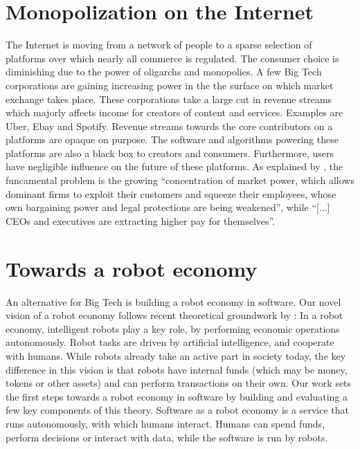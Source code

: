 \section{Monopolization on the Internet}
The Internet is moving from a network of people to a sparse selection of platforms over which nearly all commerce is regulated. The consumer choice is diminishing due to the power of oligarchs and monopolies. A few Big Tech corporations are gaining increasing power in the the surface on which market exchange takes place. These corporations take a large cut in revenue streams which majorly affects income for creators of content and services. Examples are Uber, Ebay and Spotify. Revenue streams towards the core contributors on a platforms are opaque on purpose. The software and algorithms powering these platforms are also a black box to creators and consumers. Furthermore, users have negligible influence on the future of these platforms. As explained by \citep{stiglitz2019market}, the funcamental problem is the growing ``concentration of market power, which allows dominant firms to exploit their customers and squeeze their employees, whose own bargaining power and legal protections are being weakened'', while ``[...] CEOs and executives are extracting higher pay for themselves''.

\section{Towards a robot economy}
An alternative for Big Tech is building a robot economy in software. Our novel vision of a robot economy follows recent theoretical groundwork by \cite{arduengo2020robot}: In a robot economy, intelligent robots play a key role, by performing economic operations autonomously. Robot tasks are driven by artificial intelligence, and cooperate with humans. While robots already take an active part in society today, the key difference in this vision is that robots have internal funds (which may be money, tokens or other assets) and can perform transactions on their own. Our work sets the first steps towards a robot economy in software by building and evaluating a few key components of this theory. Software as a robot economy is a service that runs autonomously, with which humans interact. Humans can spend funds, perform decisions or interact with data, while the software is run by robots.

